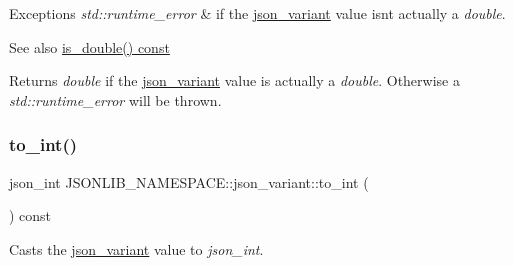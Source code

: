 \begin{DoxyExceptions}{Exceptions}
{\em std\+::runtime\+\_\+error} & if the \hyperlink{classJSONLIB__NAMESPACE_1_1json__variant}{json\+\_\+variant} value isn\textquotesingle{}t actually a {\itshape double}. \\
\hline
\end{DoxyExceptions}
\begin{DoxySeeAlso}{See also}
\hyperlink{classJSONLIB__NAMESPACE_1_1json__variant_a7f294ce9b078aca12e0f96df7275ff0b}{is\+\_\+double() const} 
\end{DoxySeeAlso}
\begin{DoxyReturn}{Returns}
{\itshape double} if the \hyperlink{classJSONLIB__NAMESPACE_1_1json__variant}{json\+\_\+variant} value is actually a {\itshape double}. Otherwise a {\itshape std\+::runtime\+\_\+error} will be thrown. 
\end{DoxyReturn}
\mbox{\label{classJSONLIB__NAMESPACE_1_1json__variant_a8f30debf624e1a9d6cdc8aed8f7bda3d}} 
\subsubsection{\texorpdfstring{to\+\_\+int()}{to\_int()}}
{\footnotesize\ttfamily json\+\_\+int J\+S\+O\+N\+L\+I\+B\+\_\+\+N\+A\+M\+E\+S\+P\+A\+C\+E\+::json\+\_\+variant\+::to\+\_\+int (\begin{DoxyParamCaption}{ }\end{DoxyParamCaption}) const}



Casts the \hyperlink{classJSONLIB__NAMESPACE_1_1json__variant}{json\+\_\+variant} value to {\itshape json\+\_\+int}. 


